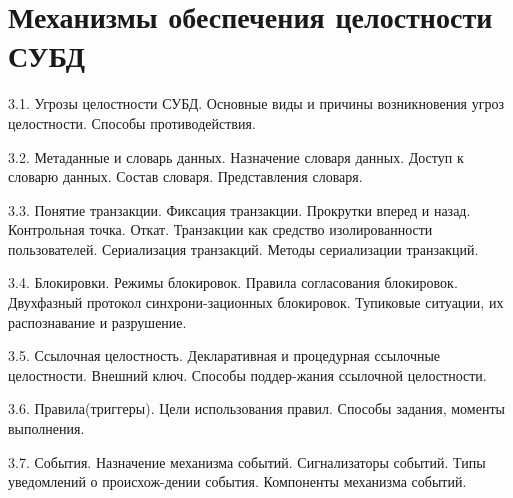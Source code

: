 \section{Механизмы обеспечения целостности СУБД}
3.1. Угрозы целостности СУБД.
Основные виды и причины возникновения угроз целостности. Способы противодействия.

3.2. Метаданные и словарь данных.
Назначение словаря данных. Доступ к словарю данных. Состав словаря. Представления словаря.

3.3. Понятие транзакции.
Фиксация транзакции. Прокрутки вперед и назад. Контрольная точка. Откат. Транзакции как средство изолированности пользователей. Сериализация транзакций. Методы сериализации транзакций.

3.4. Блокировки.
Режимы блокировок. Правила согласования блокировок. Двухфазный протокол синхрони-зационных блокировок. Тупиковые ситуации, их распознавание и разрушение.

3.5. Ссылочная целостность.
Декларативная и процедурная ссылочные целостности. Внешний ключ. Способы поддер-жания ссылочной целостности. 

3.6. Правила(триггеры).
Цели использования правил. Способы задания, моменты выполнения.

3.7. События.
Назначение механизма событий. Сигнализаторы событий. Типы уведомлений о происхож-дении события. Компоненты механизма событий.